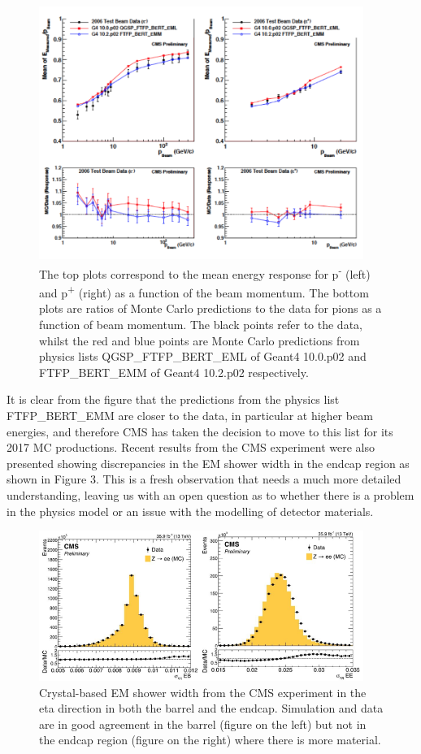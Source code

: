 \documentclass[12pt,a4paper]{article}
\begin{document}
\begin{figure}[bthp]
\centering
\includegraphics[width=0.94\textwidth]{image2.png}
\caption{The top plots correspond to the mean energy response for
p\textsuperscript{-} (left) and p\textsuperscript{+} (right) as a
function of the beam momentum. The bottom plots are ratios of Monte
Carlo predictions to the data for pions as a function of beam momentum.
The black points refer to the data, whilst the red and blue points are
Monte Carlo predictions from physics lists QGSP\_FTFP\_BERT\_EML of
Geant4 10.0.p02 and FTFP\_BERT\_EMM of Geant4 10.2.p02 respectively.}
\label{fig:enresp}
\end{figure}

It is clear from the figure that the predictions from the
physics list FTFP\_BERT\_EMM are closer to the data, in particular at
higher beam energies, and therefore CMS has taken the decision to move
to this list for its 2017 MC productions. Recent results from the CMS
experiment were also presented showing discrepancies in the EM shower
width in the endcap region as shown in Figure 3. This is a fresh
observation that needs a much more detailed understanding, leaving us
with an open question as to whether there is a problem in the physics
model or an issue with the modelling of detector materials.

\begin{figure}[bthp]
\centering
\includegraphics[width=0.94\textwidth]{image3.png}
\caption{Crystal-based EM shower width from the CMS experiment in the 
eta direction in both the barrel and the endcap. Simulation and data
are in good agreement in the barrel (figure on the left) but not in
the endcap region (figure on the right) where there is more material.}
\label{fig:emshwid}
\end{figure}
\end{document}
